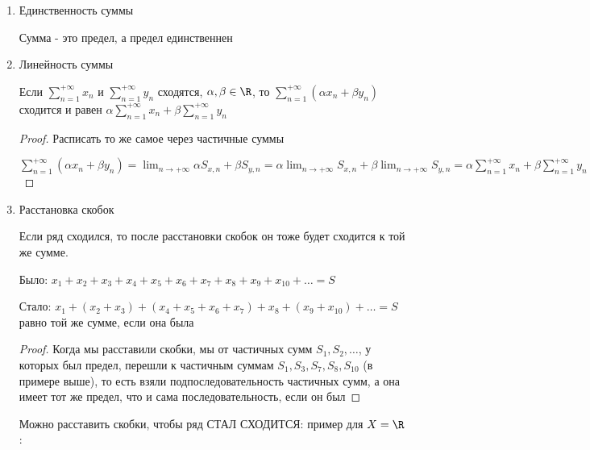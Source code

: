 \begin{properties} \thmslashn

    \begin{enumerate}

        \item Единственность суммы

            Сумма - это предел, а предел единственнен
        \item Линейность суммы

        Если $\sum\limits_{n = 1}^{+\infty} x_n$ и $\sum\limits_{n =1}^{+\infty} y_n$ сходятся, $\alpha, \beta \in \R$, то $\sum\limits_{n =1}^{+\infty} (\alpha x_n + \beta y_n)$ сходится и равен $\alpha \sum\limits_{n =1}^{+\infty} x_n + \beta \sum\limits_{n =1}^{+\infty} y_n$

            \begin{proof} 
        
                Расписать то же самое через частичные суммы 
    
                $\sum\limits_{n =1}^{+\infty} (\alpha x_n + \beta y_n) = \lim_{n\to +\infty} {\alpha S_{x, n} + \beta S_{y, n}} = \alpha \lim_{n \to +\infty} S_{x,n} + \beta \lim_{n \to +\infty} S_{y,n} = \alpha \sum\limits_{n =1}^{+\infty} x_n + \beta \sum\limits_{n =1}^{+\infty} y_n$
                
            \end{proof}

        \item Расстановка скобок

            Если ряд сходился, то после расстановки скобок он тоже будет сходится к той же сумме.

            Было: $x_1 + x_2 + x_3 + x_4 + x_5 + x_6 + x_7 + x_8 + x_9 + x_{10} + \dots = S$

            Стало: $x_1 + (x_2 + x_3) + (x_4 + x_5 + x_6 + x_7) + x_8 + (x_9 + x_{10}) + \dots = S$ равно той же сумме, если она была

            \begin{proof} Когда мы расставили скобки, мы от частичных сумм $S_1, S_2, \dots$, у которых был предел, перешли к частичным суммам $S_1, S_3, S_7, S_8, S_{10}$ (в примере выше), то есть взяли подпоследовательность частичных сумм, а она имеет тот же предел, что и сама последовательность, если он был
            \end{proof}

            \begin{remark}
                Можно расставить скобки, чтобы ряд СТАЛ СХОДИТСЯ: пример для $X = \R$:


\end{remark}
\end{enumerate}
\end{properties}
